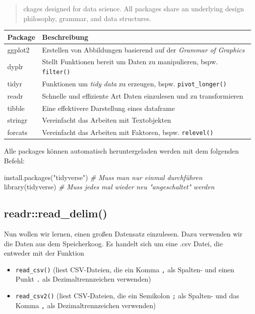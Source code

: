 \documentclass[
]{article}
\newenvironment{Shaded}{\begin{snugshade}}{\end{snugshade}}
\newcommand{\CommentTok}[1]{\textcolor[rgb]{0.56,0.35,0.01}{\textit{#1}}}
\newcommand{\FunctionTok}[1]{\textcolor[rgb]{0.00,0.00,0.00}{#1}}
\newcommand{\NormalTok}[1]{#1}
\newcommand{\StringTok}[1]{\textcolor[rgb]{0.31,0.60,0.02}{#1}}
\providecommand{\tightlist}{%
  \setlength{\itemsep}{0pt}\setlength{\parskip}{0pt}}
\begin{document}
\begin{quote}
ckages designed for data science. All packages share an underlying design philosophy, grammar, and data structures.
\end{quote}

\begin{longtable}[]{@{}ll@{}}
\toprule
Package & Beschreibung \\
\midrule
\endhead
ggplot2 & Erstellen von Abbildungen basierend auf der \emph{Grammar of Graphics} \\
dyplr & Stellt Funktionen bereit um Daten zu manipulieren, bspw. \texttt{filter()} \\
tidyr & Funktionen um \emph{tidy data} zu erzeugen, bspw. \texttt{pivot\_longer()} \\
readr & Schnelle und effiziente Art Daten einzulesen und zu transformieren \\
tibble & Eine effektivere Darstellung eines dataframe \\
stringr & Vereinfacht das Arbeiten mit Textobjekten \\
forcats & Vereinfacht das Arbeiten mit Faktoren, bspw. \texttt{relevel()} \\
\bottomrule
\end{longtable}

Alle packages können automatisch heruntergeladen werden mit dem folgenden Befehl:

\begin{Shaded}
\begin{Highlighting}[]
\FunctionTok{install.packages}\NormalTok{(}\StringTok{"tidyverse"}\NormalTok{) }\CommentTok{\# Muss man nur einmal durchführen}
\FunctionTok{library}\NormalTok{(tidyverse)            }\CommentTok{\# Muss jedes mal wieder neu "angeschaltet" werden}
\end{Highlighting}
\end{Shaded}

\hypertarget{readrread_delim}{%
\subsection{readr::read\_delim()}\label{readrread_delim}}

Nun wollen wir lernen, einen großen Datensatz einzulesen. Dazu verwenden wir die Daten aus dem Speicherkoog. Es handelt sich um eine .csv Datei, die entweder mit der Funktion

\begin{itemize}
\tightlist
\item
  \texttt{read\_csv()} (liest CSV-Dateien, die ein Komma \texttt{,} als Spalten- und einen Punkt \texttt{.} als Dezimaltrennzeichen verwenden)
\item
  \texttt{read\_csv2()} (liest CSV-Dateien, die ein Semikolon \texttt{;} als Spalten- und das Komma \texttt{,} als Dezimaltrennzeichen verwenden)
\end{itemize}
\end{document}
